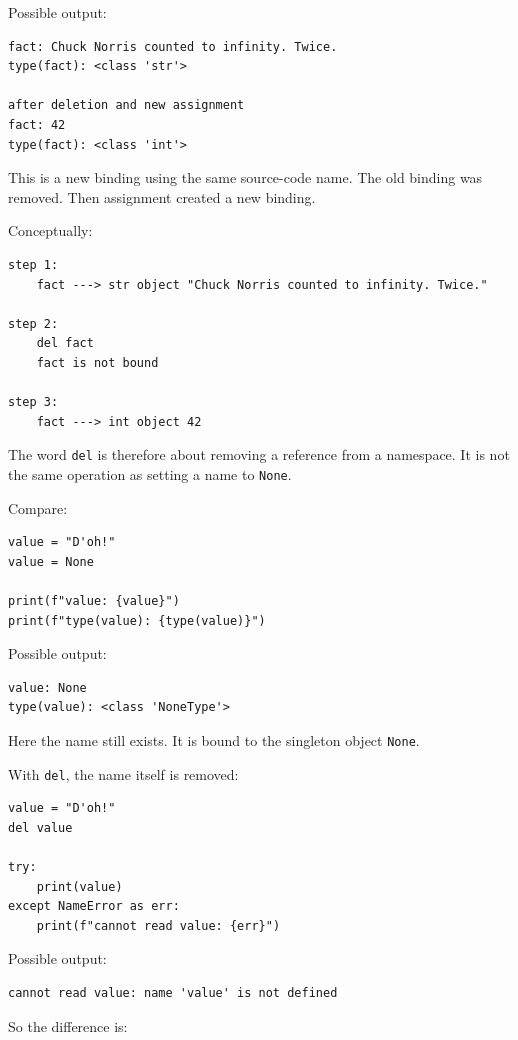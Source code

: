 Possible output:

\begin{verbatim}
fact: Chuck Norris counted to infinity. Twice.
type(fact): <class 'str'>

after deletion and new assignment
fact: 42
type(fact): <class 'int'>
\end{verbatim}

This is a new binding using the same source-code name. The old binding was removed. Then assignment created a new binding.

Conceptually:

\begin{verbatim}
step 1:
    fact ---> str object "Chuck Norris counted to infinity. Twice."

step 2:
    del fact
    fact is not bound

step 3:
    fact ---> int object 42
\end{verbatim}

The word \texttt{del} is therefore about removing a reference from a namespace. It is not the same operation as setting a name to \texttt{None}.

Compare:

\begin{verbatim}
value = "D'oh!"
value = None

print(f"value: {value}")
print(f"type(value): {type(value)}")
\end{verbatim}

Possible output:

\begin{verbatim}
value: None
type(value): <class 'NoneType'>
\end{verbatim}

Here the name still exists. It is bound to the singleton object \texttt{None}.

With \texttt{del}, the name itself is removed:

\begin{verbatim}
value = "D'oh!"
del value

try:
    print(value)
except NameError as err:
    print(f"cannot read value: {err}")
\end{verbatim}

Possible output:

\begin{verbatim}
cannot read value: name 'value' is not defined
\end{verbatim}

So the difference is:

